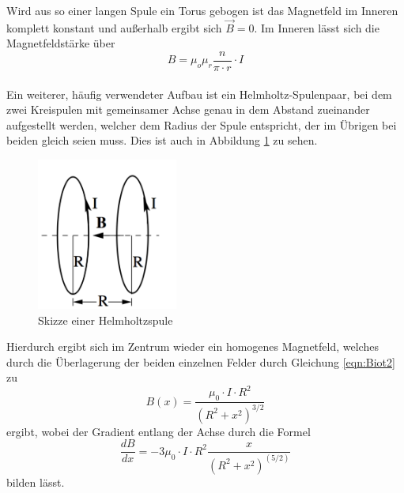 \noindent Wird aus so einer langen Spule ein Torus gebogen ist das Magnetfeld im
Inneren komplett konstant und außerhalb ergibt sich $ \vec{B} = 0$. Im Inneren
lässt sich die Magnetfeldstärke über
\begin{equation}
    B= \mu_o \mu_r \frac{n}{\pi \cdot r} \cdot I
    \label{eqn:torus}
  \end{equation} \\

  \noindent Ein weiterer, häufig verwendeter Aufbau ist ein Helmholtz-Spulenpaar,
  bei dem zwei Kreispulen mit gemeinsamer Achse genau in dem Abstand zueinander
  aufgestellt werden, welcher dem Radius der Spule entspricht, der im Übrigen
  bei beiden gleich seien muss. Dies ist auch in Abbildung \ref{fig:helm} zu sehen.
  \begin{figure}[H]
    \centering
    \includegraphics[height=5cm]{Helmholtz.png}
    \caption{Skizze einer Helmholtzspule \cite{skript}}
    \label{fig:helm}
  \end{figure}

  \noindent Hierdurch ergibt sich im Zentrum wieder ein homogenes
  Magnetfeld, welches durch die Überlagerung der beiden einzelnen Felder durch Gleichung
  \ref{eqn:Biot2} zu
  \begin{equation}
    B(x)= \frac{\mu_0 \cdot I \cdot R^2}{(R^2 + x^2)^{3/2}}
    \label{eqn:Helmholtz}
  \end{equation}
  ergibt, wobei der Gradient entlang der Achse durch die Formel
  \begin{equation}
    \frac{dB}{dx} = -3\mu_0 \cdot I \cdot R^2 \frac{x}{(R^2+x^2)^(5/2)}
    \label{eqn:gradient}
  \end{equation}
bilden lässt. \\


